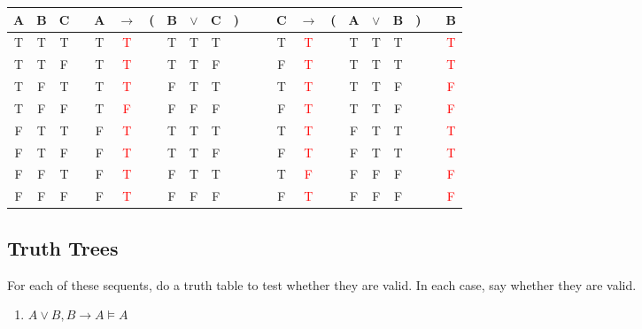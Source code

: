 \documentclass[
  11pt,
]{article}
\providecommand{\tightlist}{%
  \setlength{\itemsep}{0pt}\setlength{\parskip}{0pt}}
\begin{document}
\begin{tabular}{@{ }c@{ }@{ }c@{ }@{ }c | c@{ }@{ }c@{ }@{ }c@{ }@{}c@{}@{ }c@{ }@{ }c@{ }@{ }c@{ }@{}c@{}@{ }c | c@{ }@{ }c@{ }@{ }c@{ }@{}c@{}@{ }c@{ }@{ }c@{ }@{ }c@{ }@{}c@{}@{ }c | c}
A & B & C &  & A & $\rightarrow$ & ( & B & $\lor$ & C & ) &  &  & C & $\rightarrow$ & ( & A & $\lor$ & B & ) &  & B\\
\hline 
T & T & T &  & T & \textcolor{red}{T} &  & T & T & T &  &  &  & T & \textcolor{red}{T} &  & T & T & T &  &  & \textcolor{red}{T}\\
T & T & F &  & T & \textcolor{red}{T} &  & T & T & F &  &  &  & F & \textcolor{red}{T} &  & T & T & T &  &  & \textcolor{red}{T}\\
T & F & T &  & T & \textcolor{red}{T} &  & F & T & T &  &  &  & T & \textcolor{red}{T} &  & T & T & F &  &  & \textcolor{red}{F}\\
T & F & F &  & T & \textcolor{red}{F} &  & F & F & F &  &  &  & F & \textcolor{red}{T} &  & T & T & F &  &  & \textcolor{red}{F}\\
F & T & T &  & F & \textcolor{red}{T} &  & T & T & T &  &  &  & T & \textcolor{red}{T} &  & F & T & T &  &  & \textcolor{red}{T}\\
F & T & F &  & F & \textcolor{red}{T} &  & T & T & F &  &  &  & F & \textcolor{red}{T} &  & F & T & T &  &  & \textcolor{red}{T}\\
F & F & T &  & F & \textcolor{red}{T} &  & F & T & T &  &  &  & T & \textcolor{red}{F} &  & F & F & F &  &  & \textcolor{red}{F}\\
F & F & F &  & F & \textcolor{red}{T} &  & F & F & F &  &  &  & F & \textcolor{red}{T} &  & F & F & F &  &  & \textcolor{red}{F}\\
\end{tabular}

\hypertarget{truth-trees}{%
\subsection{Truth Trees}\label{truth-trees}}

For each of these sequents, do a truth table to test whether they are
valid. In each case, say whether they are valid.

\begin{enumerate}
\def\labelenumi{\arabic{enumi}.}
\setcounter{enumi}{4}
\tightlist
\item
  \(A \vee B, B \rightarrow A \vDash A\)
\end{enumerate}
\end{document}
